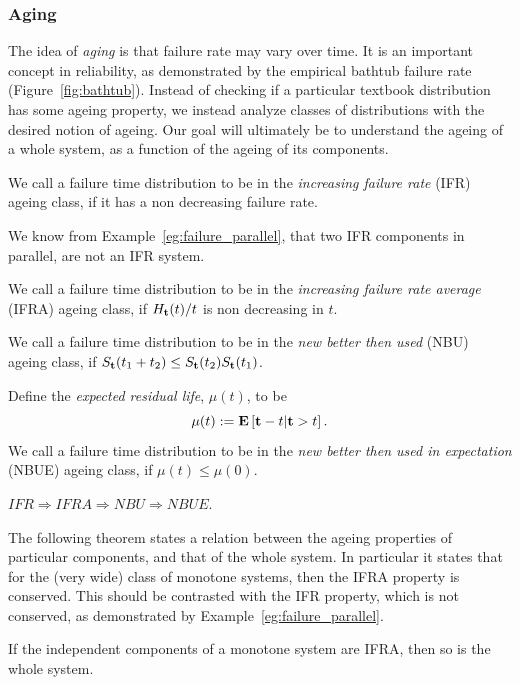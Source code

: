 \subsubsection{Aging}
The idea of \emph{aging} is that failure rate may vary over time. It is an important concept in reliability, as demonstrated by the empirical bathtub failure rate (Figure~\ref{fig:bathtub}).
Instead of checking if a particular textbook distribution has some ageing property, we instead analyze classes of distributions with the desired notion of ageing.
Our goal will ultimately be to understand the ageing of a whole system, as a function of the ageing of its components.

\begin{definition}[IFR]
We call a failure time distribution to be in the \emph{increasing failure rate} (IFR) ageing class, if it has a non decreasing failure rate.
\end{definition}
We know from Example~\ref{eg:failure_parallel}, that two IFR components in parallel, are not an IFR system.


\begin{definition}[IFRA]
We call a failure time distribution to be in the \emph{increasing failure rate average} (IFRA) ageing class, if 
$H_{\mathbf{t}} (t)/t$ is non decreasing in $t$.
\end{definition}

\begin{definition}[NBU]
We call a failure time distribution to be in the \emph{new better then used} (NBU) ageing class, if 
$S_{\mathbf{t}} (t_1+t_2) \leq S_{\mathbf{t}} (t_2) S_{\mathbf{t}} (t_1)$.
\end{definition}


\begin{definition}[NBUE]
Define the \emph{expected residual life}, $\mu(t)$, to be 
$$\mu(t):= \mathbf{E}\left[ \mathbf{t}-t|\mathbf{t}>t \right].$$
We call a failure time distribution to be in the \emph{new better then used in expectation} (NBUE) ageing class, if 
$\mu(t) \leq \mu(0)$.
\end{definition}


\begin{theorem}
$IFR \Rightarrow IFRA \Rightarrow NBU \Rightarrow NBUE. $
\end{theorem}


The following theorem states a relation between the ageing properties of particular components, and that of the whole system. In particular it states that for the (very wide) class of monotone systems, then the IFRA property is conserved. 
This should be contrasted with the IFR property, which is not conserved, as demonstrated by Example~\ref{eg:failure_parallel}.
\begin{theorem}
\label{thm:ifra_closure}
If the independent components of a monotone system are IFRA, then so is the whole system.
\end{theorem}


